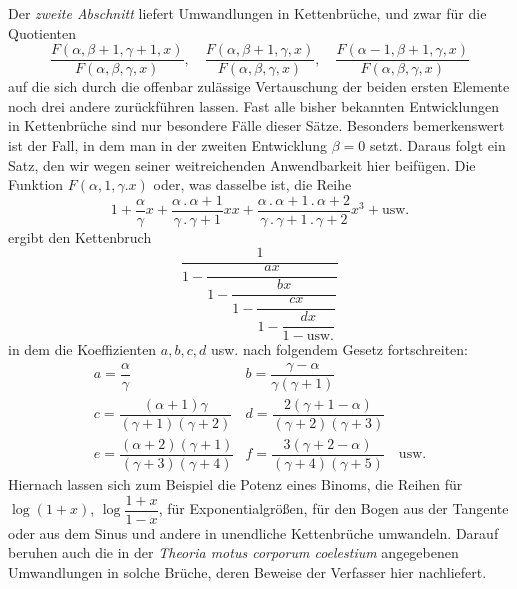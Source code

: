 Der \textit{zweite Abschnitt} liefert Umwandlungen in Kettenbrüche, und zwar für die Quotienten
\[
\frac{F(\alpha,\beta+1,\gamma+1,x)}{F(\alpha,\beta,\gamma,x)},\quad
\frac{F(\alpha,\beta+1,\gamma,x)}{F(\alpha,\beta,\gamma,x)},\quad
\frac{F(\alpha-1,\beta+1,\gamma,x)}{F(\alpha,\beta,\gamma,x)}
\]
auf die sich durch die offenbar zulässige Vertauschung der beiden ersten Elemente noch drei andere zurückführen lassen. Fast alle bisher bekannten Entwicklungen in Kettenbrüche sind nur besondere Fälle dieser Sätze.
Besonders bemerkenswert ist der Fall, in dem man in der zweiten Entwicklung $\beta=0$ setzt. Daraus folgt ein Satz, den wir wegen seiner weitreichenden Anwendbarkeit hier beifügen. Die Funktion $F(\alpha,1,\gamma.x)$ oder, was dasselbe ist, die Reihe
\[
1+\frac{\alpha}{\gamma}x
+\frac{\alpha\,.\,\alpha+1}{\gamma\,.\,\gamma+1}xx
+\frac{\alpha\,.\,\alpha+1\,.\,\alpha+2}{\gamma\,.\,\gamma+1\,.\,\gamma+2}x^3+\mathrm{usw.}
\]
ergibt den Kettenbruch
\[
\dfrac{1}{\displaystyle 1-\dfrac{ax}{\displaystyle 1-\dfrac{bx}{\displaystyle 1-\dfrac{cx}{\displaystyle 1-\dfrac{dx}{1-\mathrm{usw.}}}}}}
\]
in dem die Koeffizienten $a,b,c,d$ usw. nach folgendem Gesetz fortschreiten:
\[
\begin{array}{ll}
a=\dfrac{\alpha}{\gamma}&b=\dfrac{\gamma-\alpha}{\gamma(\gamma+1)}\\[6pt]
c=\dfrac{(\alpha+1)\gamma}{(\gamma+1)(\gamma+2)}&d=\dfrac{2(\gamma+1-\alpha)}{(\gamma+2)(\gamma+3)}\\[6pt]
e=\dfrac{(\alpha+2)(\gamma+1)}{(\gamma+3)(\gamma+4)}&f=\dfrac{3(\gamma+2-\alpha)}{(\gamma+4)(\gamma+5)}\quad\mbox{usw.}
\end{array}
\]
Hiernach lassen sich zum Beispiel die Potenz eines Binoms, die Reihen für $\log(1+x)$, $\log\dfrac{1+x}{1-x}$, für Exponentialgrößen, für den Bogen aus der Tangente oder aus dem Sinus und andere in unendliche Kettenbrüche umwandeln. Darauf beruhen auch die in der \textit{Theoria motus corporum coelestium} angegebenen Umwandlungen in solche Brüche, deren Beweise der Verfasser hier nachliefert.

